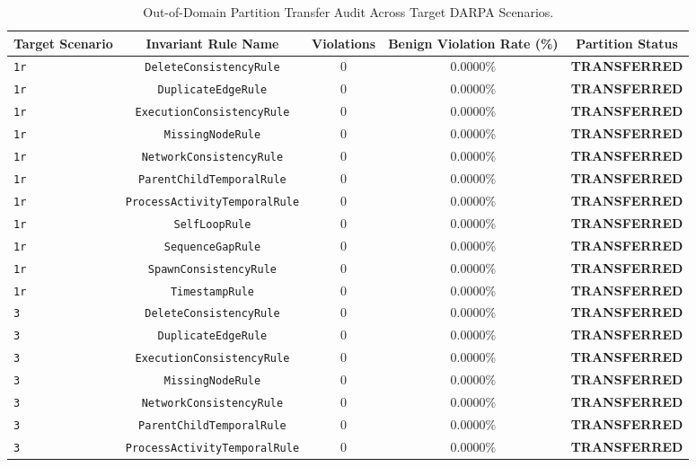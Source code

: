 \begin{table}[t]
\centering
\caption{Out-of-Domain Partition Transfer Audit Across Target DARPA Scenarios.}
\label{tab:ood_partition_transfer}
\begin{tabular}{lcccc}
\toprule
\textbf{Target Scenario} & \textbf{Invariant Rule Name} & \textbf{Violations} & \textbf{Benign Violation Rate (\%)} & \textbf{Partition Status} \\
\midrule
\texttt{1r} & \texttt{DeleteConsistencyRule} & 0 & 0.0000\% & \textbf{TRANSFERRED} \\
\texttt{1r} & \texttt{DuplicateEdgeRule} & 0 & 0.0000\% & \textbf{TRANSFERRED} \\
\texttt{1r} & \texttt{ExecutionConsistencyRule} & 0 & 0.0000\% & \textbf{TRANSFERRED} \\
\texttt{1r} & \texttt{MissingNodeRule} & 0 & 0.0000\% & \textbf{TRANSFERRED} \\
\texttt{1r} & \texttt{NetworkConsistencyRule} & 0 & 0.0000\% & \textbf{TRANSFERRED} \\
\texttt{1r} & \texttt{ParentChildTemporalRule} & 0 & 0.0000\% & \textbf{TRANSFERRED} \\
\texttt{1r} & \texttt{ProcessActivityTemporalRule} & 0 & 0.0000\% & \textbf{TRANSFERRED} \\
\texttt{1r} & \texttt{SelfLoopRule} & 0 & 0.0000\% & \textbf{TRANSFERRED} \\
\texttt{1r} & \texttt{SequenceGapRule} & 0 & 0.0000\% & \textbf{TRANSFERRED} \\
\texttt{1r} & \texttt{SpawnConsistencyRule} & 0 & 0.0000\% & \textbf{TRANSFERRED} \\
\texttt{1r} & \texttt{TimestampRule} & 0 & 0.0000\% & \textbf{TRANSFERRED} \\
\texttt{3} & \texttt{DeleteConsistencyRule} & 0 & 0.0000\% & \textbf{TRANSFERRED} \\
\texttt{3} & \texttt{DuplicateEdgeRule} & 0 & 0.0000\% & \textbf{TRANSFERRED} \\
\texttt{3} & \texttt{ExecutionConsistencyRule} & 0 & 0.0000\% & \textbf{TRANSFERRED} \\
\texttt{3} & \texttt{MissingNodeRule} & 0 & 0.0000\% & \textbf{TRANSFERRED} \\
\texttt{3} & \texttt{NetworkConsistencyRule} & 0 & 0.0000\% & \textbf{TRANSFERRED} \\
\texttt{3} & \texttt{ParentChildTemporalRule} & 0 & 0.0000\% & \textbf{TRANSFERRED} \\
\texttt{3} & \texttt{ProcessActivityTemporalRule} & 0 & 0.0000\% & \textbf{TRANSFERRED} \\

\end{tabular}
\end{table}

